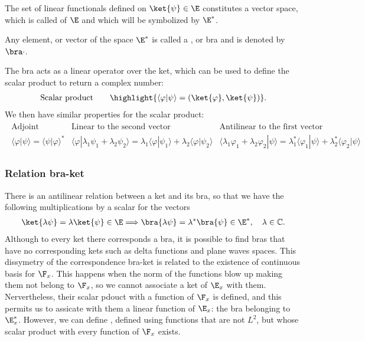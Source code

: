 The set of linear functionals defined on $\ket{\psi}\in\E$ constitutes a vector space, which is called  of $\E$ and which will 
be symbolized by $\E^*$.

Any element, or vector of the space $\E^*$ is called a , or bra and is denoted by $\bra\cdot$.

The bra acts as a linear operator over the ket, which can be used to define the scalar product to return a complex number:
\begin{align}
    \text{Scalar product}\qquad\highlight{\langle\varphi|\psi\rangle=(\ket{\varphi},\ket{\psi})}.
\end{align}
We then have similar properties for the scalar product:
\begin{align}
    \begin{array}{lll}
        \text{Adjoint}&\text{Linear to the second vector}&\text{Antilinear to the first vector}\\
        \langle\varphi|\psi\rangle=\langle\psi|\varphi\rangle^*&\langle\varphi|\lambda_1\psi_1+\lambda_2\psi_2\rangle=\lambda_1\langle\varphi|\psi_1\rangle+\lambda_2\langle\varphi|\psi_2\rangle&\langle\lambda_1\varphi_1+\lambda_2\varphi_2|\psi\rangle=\lambda_1^*\langle\varphi_1|\psi\rangle+\lambda_2^*\langle\varphi_2|\psi\rangle
    \end{array}
\end{align}

\subsubsection{Relation bra-ket}
There is an antilinear relation between a ket and its bra, so that we have the following multiplications by a scalar for the vectors
\begin{align}
    \ket{\lambda\psi}=\lambda\ket{\psi}\in\E\Longrightarrow\bra{\lambda\psi}=\lambda^*\bra{\psi}\in\E^*,\quad\lambda\in\mathbb{C}.
\end{align}
Although to every ket there corresponds a bra, it is possible to find bras that have no corresponding kets such as delta functions and plane waves spaces.
This dissymetry of the correspondence bra-ket is related to the existence of continuous basis for $\F_x$. This happens when the norm of the functions blow up 
making them not belong to $\F_x$, so we cannot associate a ket of $\E_x$ with them. Nervertheless, their scalar pdouct with a function of $\F_x$ is defined,
and this permits us to assicate with them a linear function of $\E_x$: the bra belonging to $\E_x^*$.
However, we can define , defined using functions that are not $L^2$, but whose scalar product with every function of $\F_x$ exists.


